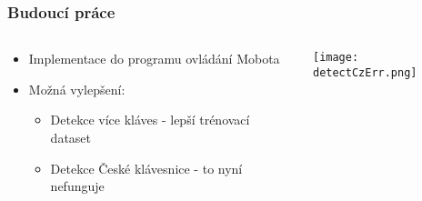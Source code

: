 \begin{frame}
   \frametitle{Budoucí práce}
   \begin{columns}[t, onlytextwidth]
      \begin{column}[T]{0.5\textwidth}
         	\begin{itemize}
            \item Implementace do programu ovládání Mobota
			\item Možná vylepšení:
			\begin{itemize}
				\item Detekce více kláves - lepší trénovací dataset
				\item Detekce České klávesnice - to nyní nefunguje
			\end{itemize}
        \end{itemize}

      \end{column}
      \begin{column}[T]{0.49\textwidth}
         \centering
         \texttt{[image: detectCzErr.png]}
      \end{column}
   \end{columns}
\end{frame}
